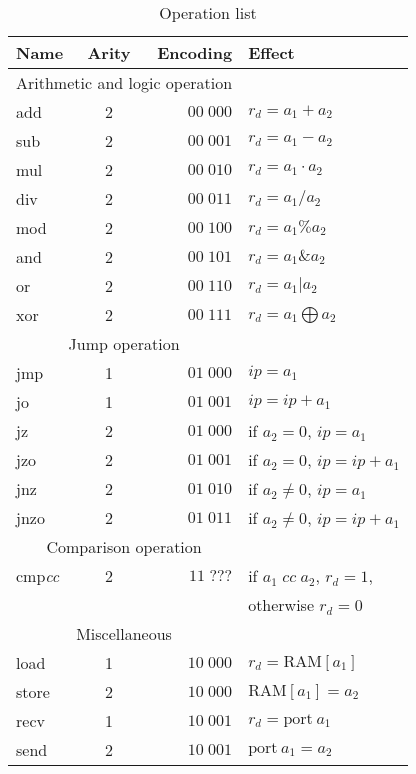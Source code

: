 \documentclass{scrartcl}
\begin{document}
\begin{table}
  \caption{Operation list}

  \begin{tabular}{lcrl}
    \toprule
    \textbf{Name} & \textbf{Arity} & \textbf{Encoding} & \textbf{Effect}\\
    \midrule
    \midrule
    \multicolumn{3}{c}{Arithmetic and logic operation}\\
    \midrule
    add & 2 & \(00\;000\) & \(r_d=a_1+a_2\)\\
    sub & 2 & \(00\;001\) & \(r_d=a_1-a_2\)\\
    mul & 2 & \(00\;010\) & \(r_d=a_1\cdot a_2\)\\
    div & 2 & \(00\;011\) & \(r_d=a_1/a_2\)\\
    mod & 2 & \(00\;100\) & \(r_d=a_1\% a_2\)\\
    and & 2 & \(00\;101\) & \(r_d=a_1 \& a_2\)\\
    or & 2 & \(00\;110\) & \(r_d=a_1 | a_2\)\\
    xor & 2 & \(00\;111\) & \(r_d=a_1\bigoplus a_2\)\\
    \midrule
    \multicolumn{3}{c}{Jump operation}\\
    \midrule
    jmp & 1 & \(01\;000\) & \(ip=a_1\)\\
    jo & 1 & \(01\;001\) & \(ip=ip+a_1\)\\
    jz & 2 & \(01\;000\) & if \(a_2=0\), \(ip=a_1\)\\
    jzo & 2 & \(01\;001\) & if \(a_2=0\), \(ip=ip+a_1\)\\
    jnz & 2 & \(01\;010\) & if \(a_2\neq0\), \(ip=a_1\)\\
    jnzo & 2 & \(01\;011\) & if \(a_2\neq0\), \(ip=ip+a_1\)\\
    \midrule
    \multicolumn{3}{c}{Comparison operation}\\
    \midrule
    cmp\textit{cc} & 2 & \(11\;???\) & if \(a_1\;cc\;a_2\), \(r_d=1\),\\
                  &  &  & otherwise \(r_d=0\)\\
    \midrule
    \multicolumn{3}{c}{Miscellaneous}\\
    \midrule
    load & 1 & \(10\;000\) & \(r_d=\mathrm{RAM}[a_1]\)\\
    store & 2 & \(10\;000\) & \(\mathrm{RAM}[a_1]=a_2\)\\
    recv & 1 & \(10\;001\) & \(r_d=\mathrm{port}~a_1\)\\
    send & 2 & \(10\;001\) & \(\mathrm{port}~a_1=a_2\)\\

\end{tabular}
\end{table}
\end{document}
